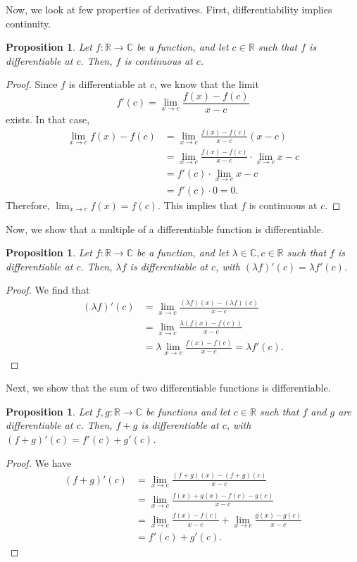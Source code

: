 \documentclass[a4paper, openany]{memoir}
\theoremstyle{definition}
\theoremstyle{plain}
\newtheorem{proposition}[definition]{Proposition}
\begin{document}
Now, we look at few properties of derivatives. First, differentiability implies continuity.
\begin{proposition}
Let $f: \mathbb{R} \to \mathbb{C}$ be a function, and let $c \in \mathbb{R}$ such that $f$ is differentiable at $c$. Then, $f$ is continuous at $c$.
\end{proposition}
\begin{proof}
Since $f$ is differentiable at $c$, we know that the limit
\[f'(c) = \lim_{x \to c} \frac{f(x) - f(c)}{x - c}\]
exists. In that case,
\begin{align*}
    \lim_{x \to c} f(x) - f(c) &= \lim_{x \to c} \frac{f(x) - f(c)}{x - c} (x - c) \\
    &= \lim_{x \to c} \frac{f(x) - f(c)}{x - c} \cdot \lim_{x \to c} x - c \\
    &= f'(c) \cdot \lim_{x \to c} x - c \\
    &= f'(c) \cdot 0 = 0.
\end{align*}
Therefore, $\lim_{x \to c} f(x) = f(c)$. This implies that $f$ is continuous at $c$.
\end{proof}
\noindent Now, we show that a multiple of a differentiable function is differentiable.
\begin{proposition}
Let $f: \mathbb{R} \to \mathbb{C}$ be a function, and let $\lambda \in \mathbb{C}, c \in \mathbb{R}$ such that $f$ is differentiable at $c$. Then, $\lambda f$ is differentiable at $c$, with $(\lambda f)'(c) = \lambda f'(c)$.
\end{proposition}
\begin{proof}
We find that
\begin{align*}
    (\lambda f)'(c) &= \lim_{x \to c} \frac{(\lambda f)(x) - (\lambda f)(c)}{x - c} \\
    &= \lim_{x \to c} \frac{\lambda (f(x) - f(c))}{x - c} \\
    &= \lambda \lim_{x \to c} \frac{f(x) - f(c)}{x - c} = \lambda f'(c).
\end{align*}
\end{proof}
\noindent Next, we show that the sum of two differentiable functions is differentiable.
\begin{proposition}
Let $f, g: \mathbb{R} \to \mathbb{C}$ be functions and let $c \in \mathbb{R}$ such that $f$ and $g$ are differentiable at $c$. Then, $f + g$ is differentiable at $c$, with $(f + g)'(c) = f'(c) + g'(c)$.
\end{proposition}
\begin{proof}
We have
\begin{align*}
    (f + g)'(c) &= \lim_{x \to c} \frac{(f + g)(x) - (f + g)(c)}{x - c} \\
    &= \lim_{x \to c} \frac{f(x) + g(x) - f(c) - g(c)}{x - c} \\
    &= \lim_{x \to c} \frac{f(x) - f(c)}{x - c} + \lim_{x \to c} \frac{g(x) - g(c)}{x - c} \\
    &= f'(c) + g'(c).
\end{align*}
\end{proof}
\end{document}
